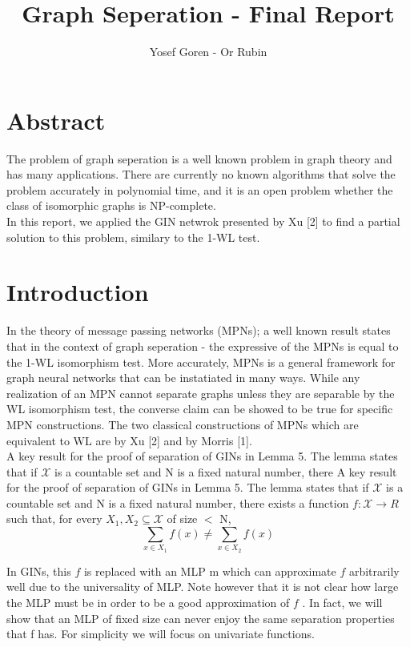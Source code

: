 \documentclass{article}
\begin{document}
\author{Yosef Goren - Or Rubin}
\title{Graph Seperation - Final Report}
\maketitle
\part*{Abstract}
The problem of graph seperation is a well known problem in graph theory and has many applications.
There are currently no known algorithms that solve the problem accurately in polynomial time, and it is an open
problem whether the class of isomorphic graphs is NP-complete.\\
In this report, we applied the GIN netwrok presented by Xu [2] to find a partial solution to this problem, 
similary to the 1-WL test.


\part*{Introduction}
In the theory of message passing networks (MPNs); a well known result states 
that in the context of graph seperation - the expressive of the MPNs is equal to the 1-WL isomorphism test.
More accurately, MPNs is a general framework for graph neural networks that can be
instatiated in many ways. While any realization of an MPN cannot separate
graphs unless they are separable by the WL isomorphism test, the converse
claim can be showed to be true for specific MPN constructions. The two classical
constructions of MPNs which are equivalent to WL are by Xu [2] and by
Morris [1].\\

A key result for the proof of separation of GINs in Lemma 5. The lemma
states that if $\mathcal{X}$ is a countable set and N is a fixed natural number, there
A key result for the proof of separation of GINs in Lemma 5. The lemma
states that if $\mathcal{X}$ is a countable set and N is a fixed natural number, there
exists a function $f : \mathcal{X} \rightarrow R$ such that, for every $X_1, X_2 \subseteq \mathcal{X}$
of size $<$ N,
\[
    \sum_{x\in X_1}f(x) \neq \sum_{x\in X_2}f(x)
\]

In GINs, this $f$ is replaced with an MLP m which can approximate $f$
arbitrarily well due to the universality of MLP. Note however that it is
not clear how large the MLP must be in order to be a good approximation
of $f$ . In fact, we will show that an MLP of fixed size can never enjoy the
same separation properties that f has. For simplicity we will focus on
univariate functions.
\end{document}
